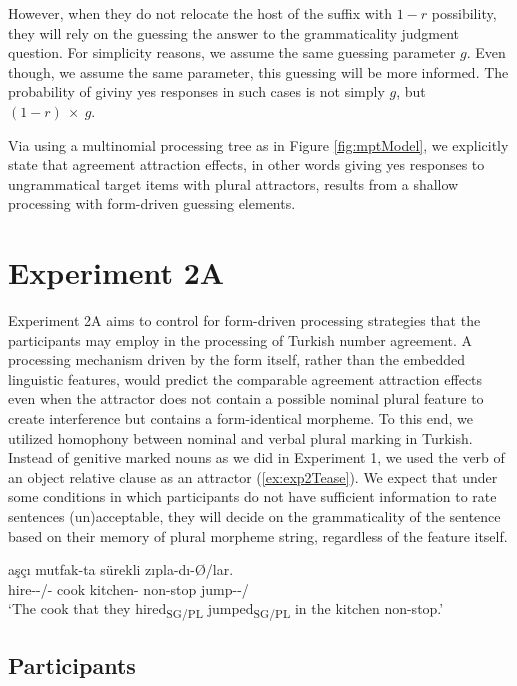 However, when they do not relocate the host of the suffix with $1-r$ possibility, they will rely on the guessing the answer to the grammaticality judgment question. For simplicity reasons, we assume the same guessing parameter $g$. Even though, we assume the same parameter, this guessing will be more informed. The probability of giviny yes responses in such cases is not simply $g$, but $(1-r){\ }\times{\ }g$. 

Via using a multinomial processing tree as in Figure \ref{fig:mptModel}, we explicitly state that agreement attraction effects, in other words giving yes responses to ungrammatical target items with plural attractors, results from a shallow processing with form-driven guessing elements.

\section{Experiment 2A}

Experiment 2A aims to control for form-driven processing strategies that the participants may employ in the processing of Turkish number agreement. A processing mechanism driven by the form itself, rather than the embedded linguistic features, would predict the comparable agreement attraction effects even when the attractor does not contain a possible nominal plural feature to create interference but contains a form-identical morpheme. To this end, we utilized homophony between nominal and verbal plural marking in Turkish. Instead of genitive marked nouns as we did in Experiment 1, we used the verb of an object relative clause as an attractor (\ref{ex:exp2Tease}). We expect that under some conditions in which participants do not have sufficient information to rate sentences (un)acceptable, they will decide on the grammaticality of the sentence based on their memory of plural morpheme string, regardless of the feature itself. 

\ea \label{ex:exp2Tease}
     {a\c{s}\c{c}{\i}} mutfak-ta s{\"u}rekli z{\i}pla-d{\i}-\O/lar.\\
    hire-\Nmlz{}-\Sg{}/\Pl{}-\Poss{} cook kitchen-\Loc{} non-stop jump-\Pst{}-\Sg{}/\Pl{}\\
    \glt `The cook that they hired\textsubscript{SG/PL} jumped\textsubscript{SG/PL} in the kitchen non-stop.'
\z


\subsection{Participants}

